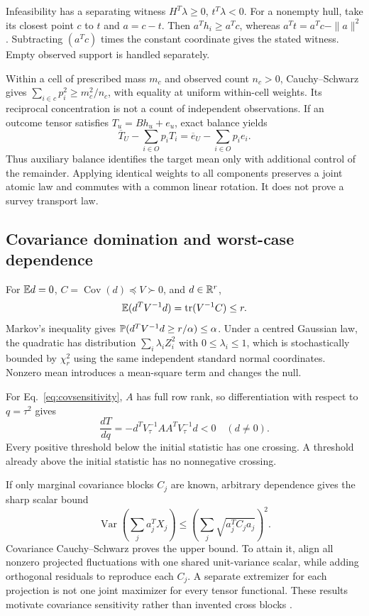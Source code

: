 Infeasibility has a separating witness $H^T\lambda\geq0$, $t^T\lambda<0$. For a nonempty hull, take its closest point $c$ to $t$ and $a=c-t$. Then $a^Th_i\geq a^Tc$, whereas $a^Tt=a^Tc-\|a\|^2$. Subtracting $(a^Tc)$ times the constant coordinate gives the stated witness. Empty observed support is handled separately.

Within a cell of prescribed mass $m_c$ and observed count $n_c>0$, Cauchy--Schwarz gives $\sum_{i\in c}p_i^2\geq m_c^2/n_c$, with equality at uniform within-cell weights. Its reciprocal concentration is not a count of independent observations. If an outcome tensor satisfies $T_u=Bh_u+e_u$, exact balance yields
\begin{equation}
 \overline T_U-\sum_{i\in O}p_iT_i
 =\overline e_U-\sum_{i\in O}p_ie_i.
\end{equation}
Thus auxiliary balance identifies the target mean only with additional control of the remainder. Applying identical weights to all components preserves a joint atomic law and commutes with a common linear rotation. It does not prove a survey transport law.

\subsection{Covariance domination and worst-case dependence}

For $\mathbb E d=0$, $C=\operatorname{Cov}(d)\preceq V\succ0$, and $d\in\mathbb R^r$,
\begin{equation}
 \mathbb E(d^TV^{-1}d)=\operatorname{tr}(V^{-1}C)\leq r.
\end{equation}
Markov's inequality gives $\mathbb P(d^TV^{-1}d\geq r/\alpha)\leq\alpha$. Under a centred Gaussian law, the quadratic has distribution $\sum_i\lambda_iZ_i^2$ with $0\leq\lambda_i\leq1$, which is stochastically bounded by $\chi_r^2$ using the same independent standard normal coordinates. Nonzero mean introduces a mean-square term and changes the null.

For Eq.~\eqref{eq:covsensitivity}, $A$ has full row rank, so differentiation with respect to $q=\tau^2$ gives
\begin{equation}
 \frac{dT}{dq}=-d^TV_\tau^{-1}AA^TV_\tau^{-1}d<0\quad(d\ne0).
\end{equation}
Every positive threshold below the initial statistic has one crossing. A threshold already above the initial statistic has no nonnegative crossing.

If only marginal covariance blocks $C_j$ are known, arbitrary dependence gives the sharp scalar bound
\begin{equation}
 \operatorname{Var}\left(\sum_j a_j^TX_j\right)
 \leq\left(\sum_j\sqrt{a_j^TC_ja_j}\right)^2.
 \label{eq:worstdependence}
\end{equation}
Covariance Cauchy--Schwarz proves the upper bound. To attain it, align all nonzero projected fluctuations with one shared unit-variance scalar, while adding orthogonal residuals to reproduce each $C_j$. A separate extremizer for each projection is not one joint maximizer for every tensor functional. These results motivate covariance sensitivity rather than invented cross blocks \cite{CocciPlagborg2025}.

